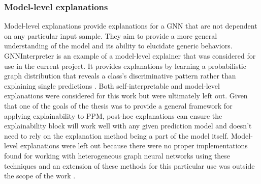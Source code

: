     \subsubsection{Model-level explanations}
        Model-level explanations provide explanations for a GNN that are not dependent on any particular input sample. They aim to provide a more general understanding of the model and its ability to elucidate generic behaviors. GNNInterpreter is an example of a model-level explainer that was considered for use in the current project. It provides explanations by learning a probabilistic graph distribution that reveals a class's discriminative pattern rather than explaining single predictions \cite{wang2023}. 
        Both self-interpretable and model-level explanations were considered for this work but were ultimately left out. 
        Given that one of the goals of the thesis was to provide a general framework for applying explainability to PPM, post-hoc explanations can ensure the explainability block will work well with any given prediction model and doesn't need to rely on the explanation method being a part of the model itself. Model-level explanations were left out because there were no proper implementations found for working with heterogeneous graph neural networks using these techniques and an extension of these methods for this particular use was outside the scope of the work \cite{yuan2022} \cite{nandan2025}.

